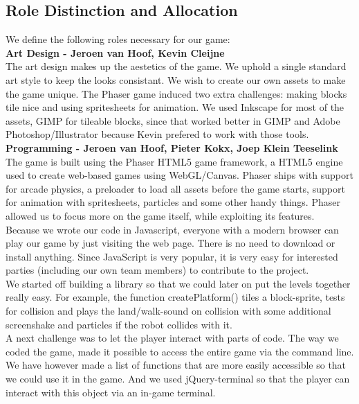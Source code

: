 \documentclass[a4paper,twoside,12pt]{article}
\begin{document}
\subsection{Role Distinction and Allocation}
We define the following roles necessary for our game: \\

\textbf{Art Design - Jeroen van Hoof, Kevin Cleijne} \\
The art design makes up the aestetics of the game. We uphold a single standard art style to keep the looks consistant. We wish to create our own assets to make the game unique. The Phaser game induced two extra challenges: making blocks tile nice and using spritesheets for animation. We used Inkscape for most of the assets, GIMP for tileable blocks, since that worked better in GIMP and Adobe Photoshop/Illustrator because Kevin prefered to work with those tools.\\

\textbf{Programming - Jeroen van Hoof, Pieter Kokx, Joep Klein Teeselink} \\
The game is built using the Phaser HTML5 game framework, a HTML5 engine used to create web-based games using WebGL/Canvas. Phaser ships with support for arcade physics, a preloader to load all assets before the game starts, support for animation with spritesheets, particles and some other handy things. Phaser allowed us to focus more on the game itself, while exploiting its features.\\

Because we wrote our code in Javascript, everyone with a modern browser can play our game by just visiting the web page. There is no need to download or install anything. Since JavaScript is very popular, it is very easy for interested parties (including our own team members) to contribute to the project.\\

We started off building a library so that we could later on put the levels together really easy. For example, the function createPlatform() tiles a block-sprite, tests for collision and plays the land/walk-sound on collision with some additional screenshake and particles if the robot collides with it.\\

A next challenge was to let the player interact with parts of code. The way we coded the game, made it possible to access the entire game via the command line. We have however made a list of functions that are more easily accessible so that we could use it in the game. And we used jQuery-terminal so that the player can interact with this object via an in-game terminal.\\
\end{document}
